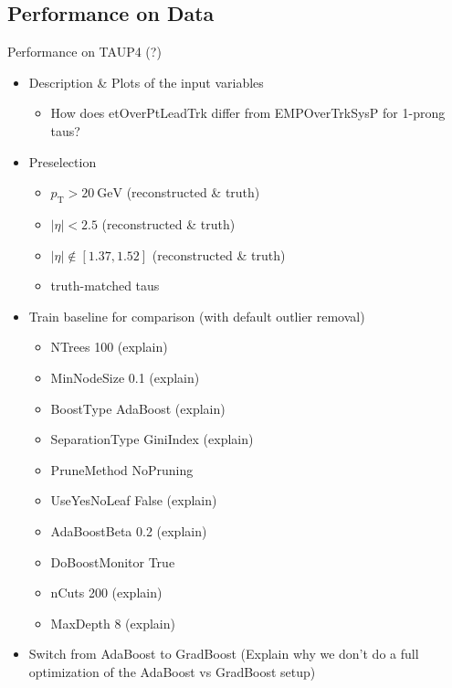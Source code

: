 \subsection{Performance on Data}
\label{sec:bdt_perf_data}

Performance on TAUP4 (?)

\begin{itemize}
\item Description \& Plots of the input variables
  \begin{itemize}
  \item How does etOverPtLeadTrk differ from EMPOverTrkSysP for 1-prong taus?
  \end{itemize}

\item Preselection
  \begin{itemize}
  \item $p_\mathrm{T} > \SI{20}{\GeV}$ (reconstructed \& truth)
  \item $| \eta | < 2.5$ (reconstructed \& truth)
  \item $| \eta | \notin \left[ 1.37, 1.52 \right]$ (reconstructed \& truth)
  \item truth-matched taus
  \end{itemize}

\item Train baseline for comparison (with default outlier removal)
  \begin{itemize}
  \item NTrees 100 (explain)
  \item MinNodeSize 0.1 (explain)
  \item BoostType AdaBoost (explain)
  \item SeparationType GiniIndex (explain)
  \item PruneMethod NoPruning
  \item UseYesNoLeaf False (explain)
  \item AdaBoostBeta 0.2 (explain)
  \item DoBoostMonitor True
  \item nCuts 200 (explain)
  \item MaxDepth 8 (explain)
  \end{itemize}

\item Switch from AdaBoost to GradBoost (Explain why we don't do a full
  optimization of the AdaBoost vs GradBoost setup)


\end{itemize}

